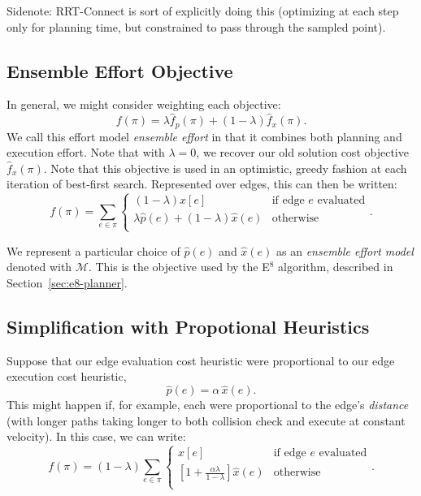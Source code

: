 Sidenote: RRT-Connect is sort of explicitly doing this
(optimizing at each step only for planning time,
but constrained to pass through the sampled point).

\subsection{Ensemble Effort Objective}

In general, we might consider weighting each objective:
\begin{equation}
   f(\pi) = \lambda \hat{f}_p(\pi) + (1 - \lambda) \hat{f}_x(\pi) .
   \label{eqn:general-objective}
\end{equation}
We call this effort model
\emph{ensemble effort}
in that it combines both planning and execution effort.
Note that with $\lambda=0$,
we recover our old solution cost objective $\hat{f}_x(\pi)$.
Note that this objective is used in an optimistic, greedy fashion at each
iteration of best-first search.
Represented over edges,
this can then be written:
\begin{equation}
   f(\pi) = \sum_{e \in \pi} \left\{
   \begin{array}{cl}
      (1 - \lambda) x[e] & \mbox{if edge } e \mbox{ evaluated}  \\
      \lambda \hat{p}(e) + (1 - \lambda) \hat{x}(e) & \mbox{otherwise} \\
   \end{array}
   \right.
   .
   \label{eqn:general-objective-explicit}
\end{equation}

We represent a particular choice of $\hat{p}(e)$
and $\hat{x}(e)$ as an \emph{ensemble effort model}
denoted with $\mathcal{M}$.
This is the objective used by the E$^8$ algorithm,
described in Section~\ref{sec:e8-planner}.

\subsection{Simplification with Propotional Heuristics}

Suppose that our edge evaluation cost heuristic
were proportional to our edge execution cost heuristic,
\begin{equation}
   \hat{p}(e) = \alpha \, \hat{x}(e) .
\end{equation}
This might happen if, for example, each were proportional to the edge's
\emph{distance} (with longer paths taking longer to both collision check
and execute at constant velocity).
In this case, we can write:
\begin{equation}
   f(\pi) = (1-\lambda) \sum_{e \in \pi} \left\{
   \begin{array}{cl}
      x[e] & \mbox{if edge } e \mbox{ evaluated}  \\
      \left[ 1 + \frac{\alpha\lambda}{1 - \lambda} \right] \hat{x}(e) & \mbox{otherwise} \\
   \end{array}
   \right.
   .
   \label{eqn:prop-heuristics}
\end{equation}

